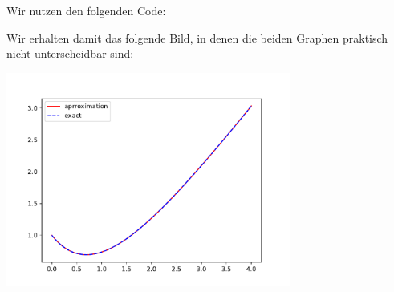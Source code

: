 \section{}

Wir nutzen den folgenden Code:



Wir erhalten damit das folgende Bild, in denen die beiden Graphen praktisch nicht unterscheidbar sind:

\begin{center}
  \includegraphics[width = 0.7\textwidth]{chapter_04/exercise_04_20_figure.pdf}
\end{center}
